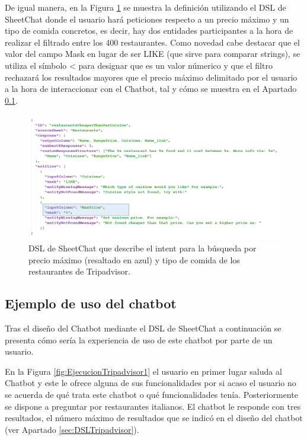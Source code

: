 De igual manera, en la Figura \ref{fig:DSLTripadvisor2} se muestra la definición utilizando el DSL de SheetChat donde el usuario hará peticiones respecto a un precio máximo y un tipo de comida concretos, es decir, hay dos entidades participantes a la hora de realizar el filtrado entre los 400 restaurantes. Como novedad cabe destacar que el valor del campo Mask en lugar de ser LIKE (que sirve para comparar strings), se utiliza el símbolo < para designar que es un valor númerico y que el filtro rechazará los resultados mayores que el precio máximo delimitado por el usuario a la hora de interaccionar con el Chatbot, tal y cómo se muestra en el Apartado \ref{sec:EjemploUsoTripadvisor}.

\begin{figure}[htb]
	\centering
	\includegraphics[width=1\textwidth]{./figs/DSLTripadvisor2.png}
	\caption{DSL de SheetChat que describe el intent para la búsqueda por precio máximo (resaltado en azul) y tipo de comida de los restaurantes de Tripadvisor.}
	\label{fig:DSLTripadvisor2}
\end{figure}

\subsection{Ejemplo de uso del chatbot}
\label{sec:EjemploUsoTripadvisor}

Tras el diseño del Chatbot mediante el DSL de SheetChat a continuación se presenta cómo sería la experiencia de uso de este chatbot por parte de un usuario.

En la Figura \ref{fig:EjecucionTripadvisor1} el usuario en primer lugar saluda al Chatbot y este le ofrece alguna de sus funcionalidades por si acaso el usuario no se acuerda de qué trata este chatbot o qué funcionalidades tenía. Posteriormente se dispone a preguntar por restaurantes italianos. El chatbot le responde con tres resultados, el número máximo de resultados que se indicó en el diseño del chatbot (ver Apartado \ref{sec:DSLTripadvisor}).

